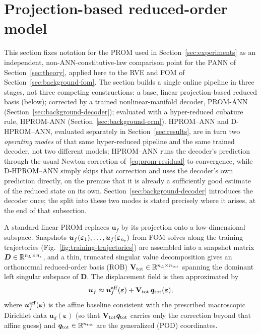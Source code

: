 \documentclass[10pt,a4paper]{article}
\begin{document}
\section{Projection-based reduced-order model}
\label{sec:rom-comparison}
This section fixes notation for the PROM used in
Section~\ref{sec:experiments} as an independent, non-ANN-constitutive-law
comparison point for the PANN of Section~\ref{sec:theory}, applied here
to the RVE and FOM of Section~\ref{sec:background-fom}. The section
builds a single online pipeline in three stages, not three competing
constructions: a
base, linear projection-based reduced basis (below); corrected by a
trained nonlinear-manifold decoder, PROM-ANN
(Section~\ref{sec:background-decoder}); evaluated with a hyper-reduced
cubature rule, HPROM-ANN (Section~\ref{sec:background-ecm}). HPROM--ANN
and D-HPROM--ANN, evaluated separately in Section~\ref{sec:results}, are
in turn two \emph{operating modes} of that same hyper-reduced pipeline
and the same trained decoder, not two different models; HPROM--ANN runs
the decoder's prediction through the usual Newton correction
of~\eqref{eq:prom-residual} to convergence, while D-HPROM--ANN simply
skips that correction and uses the decoder's own prediction directly, on
the premise that it is already a sufficiently good estimate of the
reduced state on its own. Section~\ref{sec:background-decoder}
introduces the decoder once; the split into these two modes is stated
precisely where it arises, at the end of that subsection.

A standard linear PROM replaces $\bm u_f$ by its projection onto a low-dimensional
subspace. Snapshots $\bm u_f(\bm\varepsilon_1),\dots,\bm u_f(\bm\varepsilon_{n_{\rm s}})$ from FOM
solves along the training trajectories
(Fig.~\ref{fig:training-trajectories}) are assembled into a snapshot matrix
$\bm D\in\mathbb R^{n_L\times n_{\rm s}}$, and a thin, truncated singular
value decomposition gives an orthonormal reduced-order basis (ROB)
$\mathbf V_{\rm tot}\in\mathbb R^{n_L\times n_{\rm tot}}$ spanning the
dominant left singular subspace of $\bm D$. The displacement field is then
approximated by
\begin{equation}
\label{eq:prom-affine}
 \bm u_f\approx \bm u_f^{\rm aff}(\bm\varepsilon)+\mathbf V_{\rm tot}\,\bm q_{\rm tot}(\bm\varepsilon),
\end{equation}
where $\bm u_f^{\rm aff}(\bm\varepsilon)$ is the affine baseline consistent with the
prescribed macroscopic Dirichlet data $\bm u_d(\bm\varepsilon)$ (so that
$\mathbf V_{\rm tot}\bm
q_{\rm tot}$ carries only the correction beyond that affine guess) and
$\bm q_{\rm tot}\in\mathbb R^{n_{\rm tot}}$ are the generalized (POD)
coordinates.
\end{document}
